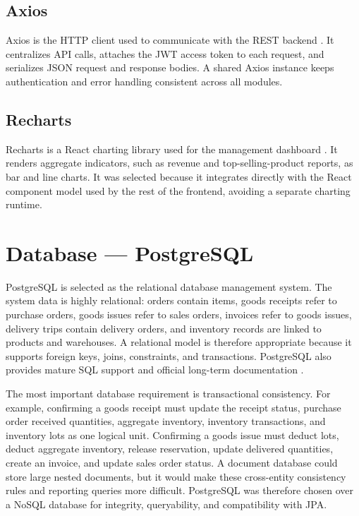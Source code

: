 \subsection{Axios}
Axios is the HTTP client used to communicate with the REST backend \cite{axios}.
It centralizes API calls, attaches the JWT access token to each request, and
serializes JSON request and response bodies. A shared Axios instance keeps
authentication and error handling consistent across all modules.

\subsection{Recharts}
Recharts is a React charting library used for the management dashboard
\cite{recharts}. It renders aggregate indicators, such as revenue and
top-selling-product reports, as bar and line charts. It was selected because it
integrates directly with the React component model used by the rest of the
frontend, avoiding a separate charting runtime.

\section{Database — PostgreSQL}
PostgreSQL is selected as the relational database management system. The system
data is highly relational: orders contain items, goods receipts refer to purchase
orders, goods issues refer to sales orders, invoices refer to goods issues,
delivery trips contain delivery orders, and inventory records are linked to
products and warehouses. A relational model is therefore appropriate because it
supports foreign keys, joins, constraints, and transactions. PostgreSQL also
provides mature SQL support and official long-term documentation
\cite{postgresql14}.

The most important database requirement is transactional consistency. For
example, confirming a goods receipt must update the receipt status, purchase
order received quantities, aggregate inventory, inventory transactions, and
inventory lots as one logical unit. Confirming a goods issue must deduct lots,
deduct aggregate inventory, release reservation, update delivered quantities,
create an invoice, and update sales order status. A document database could store
large nested documents, but it would make these cross-entity consistency rules
and reporting queries more difficult. PostgreSQL was therefore chosen over a
NoSQL database for integrity, queryability, and compatibility with JPA.

